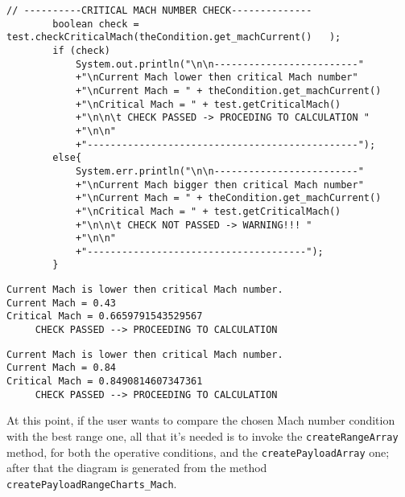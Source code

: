 \bigskip
\begin{lstlisting}[caption={Excerpt of the ATR-72 Payload-Range test - critical Mach number check}, captionpos=b, tabsize=2]
		// ----------CRITICAL MACH NUMBER CHECK--------------
		boolean check = test.checkCriticalMach(theCondition.get_machCurrent()	);
		if (check)
			System.out.println("\n\n-------------------------"
			+"\nCurrent Mach lower then critical Mach number"
			+"\nCurrent Mach = " + theCondition.get_machCurrent() 
			+"\nCritical Mach = " + test.getCriticalMach() 
			+"\n\n\t CHECK PASSED -> PROCEDING TO CALCULATION "
			+"\n\n"
			+"-----------------------------------------------");
		else{
			System.err.println("\n\n-------------------------"
			+"\nCurrent Mach bigger then critical Mach number"
			+"\nCurrent Mach = " + theCondition.get_machCurrent() 
			+"\nCritical Mach = " + test.getCriticalMach() 
			+"\n\n\t CHECK NOT PASSED -> WARNING!!! "
			+"\n\n"
			+"--------------------------------------");
		}
\end{lstlisting}

\bigskip
\begin{lstlisting}[caption={Excerpt of the ATR-72 Payload-Range test results - critical Mach number check}, captionpos=b, tabsize=2]
Current Mach is lower then critical Mach number.
Current Mach = 0.43
Critical Mach = 0.6659791543529567
	 CHECK PASSED --> PROCEEDING TO CALCULATION 
\end{lstlisting}

\bigskip
\begin{lstlisting}[caption={Excerpt of the B747-100B Payload-Range test results - critical Mach number check}, captionpos=b, tabsize=2]
Current Mach is lower then critical Mach number.
Current Mach = 0.84
Critical Mach = 0.8490814607347361
	 CHECK PASSED --> PROCEEDING TO CALCULATION 
\end{lstlisting}

\bigskip
\noindent
At this point, if the user wants to compare the chosen Mach number condition with the best range one, all that it’s needed is to invoke the \lstinline[language=Java]!createRangeArray! method, for both the operative conditions, and the \lstinline[language=Java]!createPayloadArray! one; after that the diagram is generated from the method \lstinline[language=Java]!createPayloadRangeCharts_Mach!.

